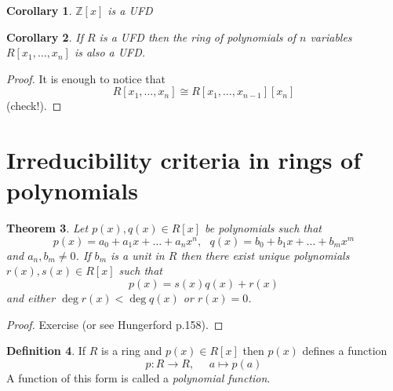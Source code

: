 \documentclass[12pt, letterpaper, oneside]{article}
\theoremstyle{plain}
\newtheorem{theorem}{Theorem}[section]
\newtheorem{corollary}[theorem]{Corollary}
\theoremstyle{definition}
\newtheorem{definition}[theorem]{Definition}
\newcommand{\lra}{\longrightarrow}
\newcommand{\Z}{{\mathbb Z}}
\newcommand{\vs}{\vskip 5mm}
\begin{document}
 
 \vs\vs 
 
 \begin{corollary}
 $\Z[x]$ is a UFD
 \end{corollary}
 
 
\vs\vs


\begin{corollary}
If $R$ is a UFD then the ring of polynomials of $n$ variables $R[x_{1}, \dots, x_{n}]$ is also a UFD.
\end{corollary} 
 
\vs

\begin{proof}
It is enough to notice that 
$$R[x_{1}, \dots, x_{n}] \cong R[x_{1}, \dots, x_{n-1}][x_{n}]$$
(check!).
\end{proof} 
 
 
 
 
 




\newpage
\section{Irreducibility criteria in rings of polynomials}
\label{SEC_IRREDINPOLYRINGS}
 
 
 

\begin{theorem}
\label{THM_POLYDIVALGORITHM}
Let $p(x), q(x)\in R[x]$ be polynomials such that 
$$p(x)= a_{0} +a_{1}x + {\dots} + a_{n}x^{n}, \ \ \ q(x) = b_{0} + b_{1}x + {\dots} + b_{m}x^{m} $$
and  $a_{n}, b_{m}\neq 0$. If $b_{m}$ is a unit in $R$ then there exist unique polynomials 
$r(x), s(x)\in R[x]$ such that  
$$p(x) = s(x)q(x) +r(x)$$
and either $\deg r(x) < \deg q(x)$ or $r(x) = 0$.
\end{theorem}
 
\vs

\begin{proof}
Exercise (or see Hungerford p.158).
\end{proof} 
 
 
\vs\vs 
 
 \begin{definition}
 If $R$ is a ring and $p(x)\in R[x]$ then $p(x)$ defines a function
 $$p\colon R\lra R, \ \ \ \ \ \ a \mapsto p(a)$$
 A function of this form is called a \emph{polynomial function}.
 \end{definition}
 
\end{document}
